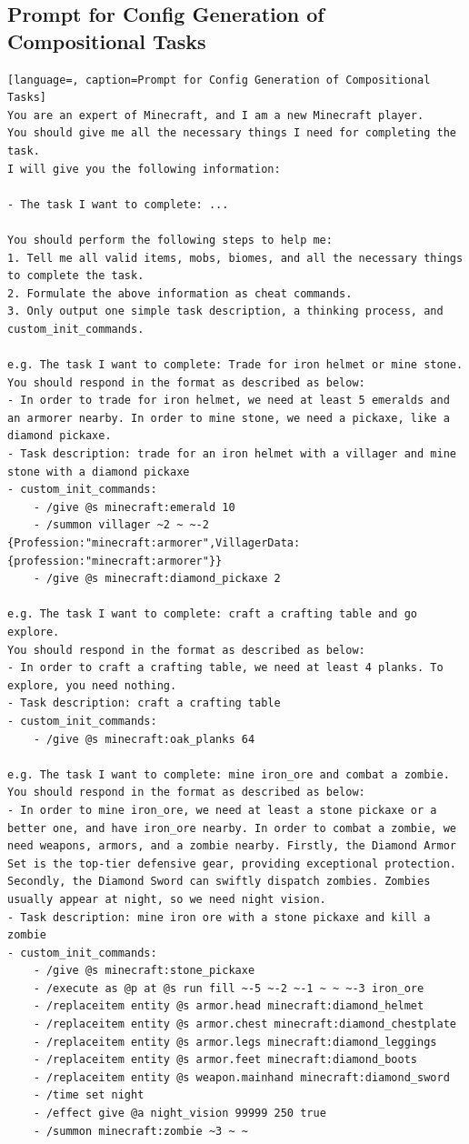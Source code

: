 \subsection{Prompt for Config Generation of Compositional Tasks}
\label{app:prompt_compose_gen}
\begin{lstlisting}[language=, caption=Prompt for Config Generation of Compositional Tasks]
You are an expert of Minecraft, and I am a new Minecraft player.  
You should give me all the necessary things I need for completing the task.  
I will give you the following information:

- The task I want to complete: ...

You should perform the following steps to help me:  
1. Tell me all valid items, mobs, biomes, and all the necessary things to complete the task.  
2. Formulate the above information as cheat commands.  
3. Only output one simple task description, a thinking process, and custom_init_commands.

e.g. The task I want to complete: Trade for iron helmet or mine stone.  
You should respond in the format as described as below:  
- In order to trade for iron helmet, we need at least 5 emeralds and an armorer nearby. In order to mine stone, we need a pickaxe, like a diamond pickaxe.  
- Task description: trade for an iron helmet with a villager and mine stone with a diamond pickaxe  
- custom_init_commands:  
    - /give @s minecraft:emerald 10  
    - /summon villager ~2 ~ ~-2 {Profession:"minecraft:armorer",VillagerData:{profession:"minecraft:armorer"}}  
    - /give @s minecraft:diamond_pickaxe 2

e.g. The task I want to complete: craft a crafting table and go explore.  
You should respond in the format as described as below:  
- In order to craft a crafting table, we need at least 4 planks. To explore, you need nothing.  
- Task description: craft a crafting table  
- custom_init_commands:  
    - /give @s minecraft:oak_planks 64

e.g. The task I want to complete: mine iron_ore and combat a zombie.  
You should respond in the format as described as below:  
- In order to mine iron_ore, we need at least a stone pickaxe or a better one, and have iron_ore nearby. In order to combat a zombie, we need weapons, armors, and a zombie nearby. Firstly, the Diamond Armor Set is the top-tier defensive gear, providing exceptional protection. Secondly, the Diamond Sword can swiftly dispatch zombies. Zombies usually appear at night, so we need night vision.  
- Task description: mine iron ore with a stone pickaxe and kill a zombie  
- custom_init_commands:  
    - /give @s minecraft:stone_pickaxe  
    - /execute as @p at @s run fill ~-5 ~-2 ~-1 ~ ~ ~-3 iron_ore  
    - /replaceitem entity @s armor.head minecraft:diamond_helmet  
    - /replaceitem entity @s armor.chest minecraft:diamond_chestplate  
    - /replaceitem entity @s armor.legs minecraft:diamond_leggings  
    - /replaceitem entity @s armor.feet minecraft:diamond_boots  
    - /replaceitem entity @s weapon.mainhand minecraft:diamond_sword  
    - /time set night  
    - /effect give @a night_vision 99999 250 true  
    - /summon minecraft:zombie ~3 ~ ~  


\end{lstlisting}
